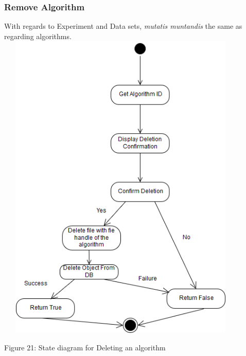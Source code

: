     \subsubsection{Remove Algorithm}
    \par With regards to Experiment and Data sets,
    { \textit{mutatis muntandis} the same as regarding algorithms.} \newline \newline
    \includegraphics[width=12cm,height=15cm,keepaspectratio]{input_unit/images/delete_algorithm_state_diagram.png}
    \begin{center}
    	\small{Figure 21: State diagram for Deleting an algorithm }
    \end{center}
    \newpage
